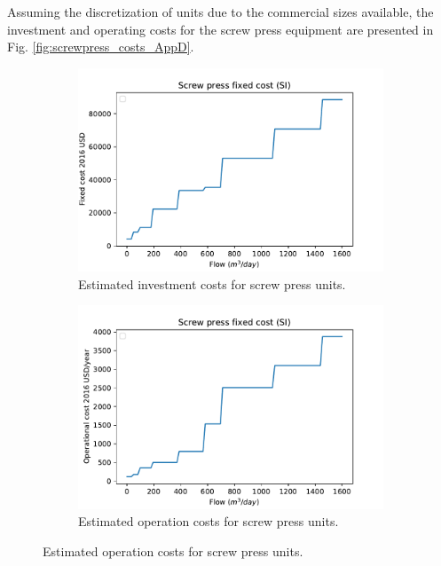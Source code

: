 \begin{refsection}[referencesApD]
Assuming the discretization of units due to the commercial sizes available, the investment and operating costs for the screw press equipment are presented in Fig. \ref{fig:screwpress_costs_AppD}.

\begin{figure}[h!]
	\centering
	\begin{subfigure}[t]{0.7\linewidth}
		\centering
		\includegraphics[width=\linewidth]{gfx/AppendixC/screwpress_unit_cost_m} 
		\caption{Estimated investment costs for screw press units.}
		\label{fig:screwpress_unit_cost_m_AppD}
	\end{subfigure}
	\bigskip
	\begin{subfigure}[t]{0.7\linewidth}
		\centering
		\includegraphics[width=\linewidth]{gfx/AppendixC/screwpress_op_cost_m}
		\caption{Estimated operation costs for screw press units.}
		\label{fig:screwpress_op_cost_m_AppD}
	\end{subfigure}
	

\end{figure}
\end{refsection}
